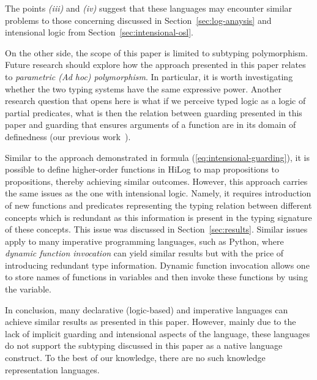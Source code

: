The points \textit{(iii)} and \textit{(iv)} suggest that these languages may encounter similar problems to those concerning \OSL discussed in Section~\ref{sec:log-anaysis} and intensional logic from Section~\ref{sec:intensional-osl}.

On the other side, the scope of this paper is limited to subtyping polymorphism. 
Future research should explore how the approach presented in this paper relates to \emph{parametric (Ad hoc) polymorphism}.
In particular, it is worth investigating whether the two typing systems have the same expressive power.
Another research question that opens here is what if we perceive typed logic as a logic of partial predicates, what is then the relation between guarding presented in this paper and guarding that ensures arguments of a function are in its domain of definedness (our previous work~\cite{DBLP:conf/jelia/MarkovicBD23}).

Similar to the approach demonstrated in formula (\ref{eq:intensional-guarding}), it is possible to define higher-order functions in HiLog to map propositions to propositions, thereby achieving similar outcomes. 
However, this approach carries the same issues as the one with intensional logic.
Namely, it requires introduction of new functions and predicates representing the typing relation between different concepts which is redundant as this information is present in the typing signature of these concepts. 
This issue was discussed in Section~\ref{sec:results}.  
Similar issues apply to many imperative programming languages, such as Python, where \emph{dynamic function invocation} can yield similar results but with the price of introducing redundant type information. 
Dynamic function invocation allows one to store names of functions in variables and then invoke these functions by using the variable.

In conclusion, many declarative (logic-based) and imperative languages can achieve similar results as presented in this paper. However, mainly due to the lack of implicit guarding and intensional aspects of the language, these languages do not support the subtyping discussed in this paper as a native language construct. To the best of our knowledge, there are no such knowledge representation languages.